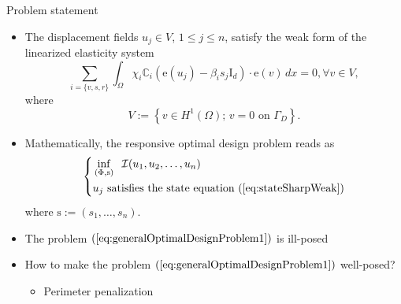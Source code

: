 \documentclass{beamer}
\newcommand{\ee}{\mathrm{e}}
\newcommand{\II}{\mathcal{I}}
\newcommand{\OO}{\Omega}
\begin{document}
\begin{frame}{Problem statement}
    \begin{itemize}
        \item The displacement fields $u_j \in V$, $1 \le j \le n$,  satisfy the weak form of the linearized elasticity system 
        \begin{equation}
            \label{eq:stateSharpWeak}
            \sum_{i=\{v,s,r\}}\int_{\OO}\chi_i \mathbb{C}_i\left(\ee(u_j) - \beta_i s_j\mathrm{I}_d\right)\cdot \ee(v)\, dx = 0,\forall v \in V,
        \end{equation}
        where 
        \begin{equation}\label{eq:sobolevSpace}
            V:= \left\{ v \in H^1(\Omega);\, v = 0 \text{ on } \Gamma_D \right\}.
        \end{equation}
        \item Mathematically, the responsive optimal design problem reads as
        \begin{equation}\label{eq:generalOptimalDesignProblem1}
        \begin{dcases}
        \begin{aligned}
              &\inf_{(\Phi,\mathrm{s})}\;\; \II(u_1,u_2,\ldots,u_n)\\
             &u_j\text{ satisfies the state equation }(\ref{eq:stateSharpWeak})
        \end{aligned}
        \end{dcases}
        \end{equation}
        where $\mathrm{s}:=(s_1, \dots , s_n).$
        \smallskip
        \item The problem $(\ref{eq:generalOptimalDesignProblem1})$ is ill-posed
        \smallskip
        \item How to make the problem $(\ref{eq:generalOptimalDesignProblem1})$ well-posed?
        \smallskip
        \begin{itemize}
           \item Perimeter penalization
        \end{itemize}
    \end{itemize}
\end{frame}
\end{document}
